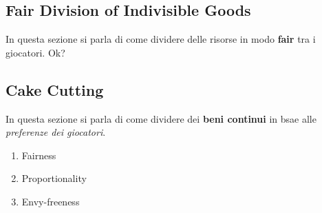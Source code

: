 \subsection{Fair Division of Indivisible Goods}
\label{sub:fair_division_of_indivisible_goods}

In questa sezione si parla di come dividere delle risorse in modo \textbf{fair}
tra i giocatori. Ok?

\subsection{Cake Cutting}
\label{sub:cake_cutting}

In questa sezione si parla di come dividere dei \textbf{beni continui} in bsae alle \textit{preferenze dei giocatori}.
\begin{enumerate}
    \item Fairness
    \item Proportionality
    \item Envy-freeness
\end{enumerate}